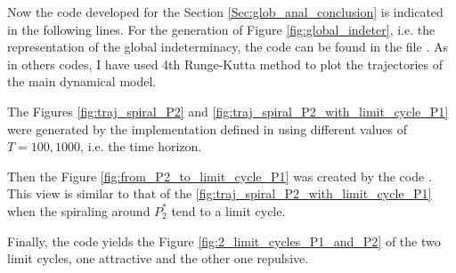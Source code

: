 Now the code developed for the Section \ref{Sec:glob_anal_conclusion} is indicated in the following lines.
For the generation of Figure \ref{fig:global_indeter}, i.e. the representation of the global indeterminacy, the code can be found in the file . As in others codes, I have used 4th Runge-Kutta method to plot the trajectories of the main dynamical model.

The Figures \ref{fig:traj_spiral_P2} and \ref{fig:traj_spiral_P2_with_limit_cycle_P1} were generated by the implementation defined in  using different values of $T=100,1000$, i.e. the time horizon. 

Then the Figure \ref{fig:from_P2_to_limit_cycle_P1} was created by the code . This view is similar to that of the \ref{fig:traj_spiral_P2_with_limit_cycle_P1} when the spiraling around $P_2^*$ tend to a limit cycle.

Finally, the code  yields the Figure \ref{fig:2_limit_cycles_P1_and_P2} of the two limit cycles, one attractive and the other one repulsive. 